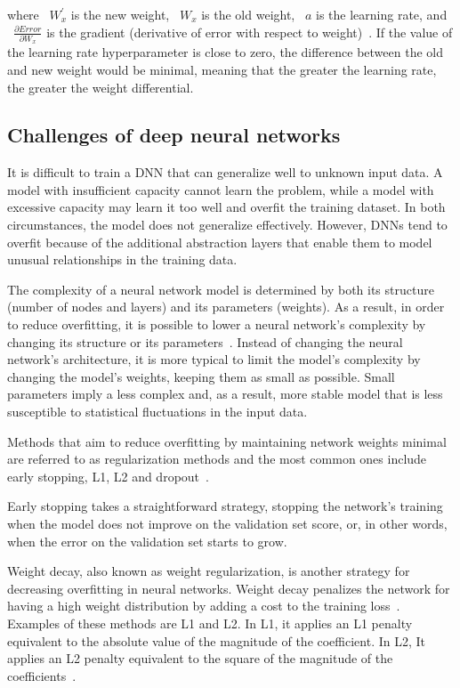 where ~$W_{x}^{'}$ is the new weight, ~$W_{x}$ is the old weight, ~$a$ is the learning rate, and ~$\frac{\partial Error}{\partial W_{x}}$ is the gradient (derivative of error with respect to weight)~\cite{Kim2021EasyAlgorithm}. If the value of the learning rate hyperparameter is close to zero, the difference between the old and new weight would be minimal, meaning that the greater the learning rate, the greater the weight differential.

\subsection{Challenges of deep neural networks}

It is difficult to train a \gls{DNN} that can generalize well to unknown input data. A model with insufficient capacity cannot learn the problem, while a model with excessive capacity may learn it too well and overfit the training dataset. In both circumstances, the model does not generalize effectively. However, \gls{DNN}s tend to overfit because of the additional abstraction layers that enable them to model unusual relationships in the training data.

The complexity of a neural network model is determined by both its structure (number of nodes and layers) and its parameters (weights). As a result, in order to reduce overfitting, it is possible to lower a neural network's complexity by changing its structure or its parameters~\cite{Brownlee2019HowNetworks}. Instead of changing the neural network's architecture, it is more typical to limit the model's complexity by changing the model's weights, keeping them as small as possible. Small parameters imply a less complex and, as a result, more stable model that is less susceptible to statistical fluctuations in the input data.

Methods that aim to reduce overfitting by maintaining network weights minimal are referred to as regularization methods and the most common ones include early stopping, L1, L2 and dropout~\cite{Brownlee2019HowNetworks}.

Early stopping takes a straightforward strategy, stopping the network's training when the model does not improve on the validation set score, or, in other words, when the error on the validation set starts to grow.

Weight decay, also known as weight regularization, is another strategy for decreasing overfitting in neural networks. Weight decay penalizes the network for having a high weight distribution by adding a cost to the training loss~\cite{Brownlee2019HowNetworks}. Examples of these methods are L1 and L2. In L1, it applies an L1 penalty equivalent to the absolute value of the magnitude of the coefficient. In L2, It applies an L2 penalty equivalent to the square of the magnitude of the coefficients~\cite{NgFeatureInvariance}.

